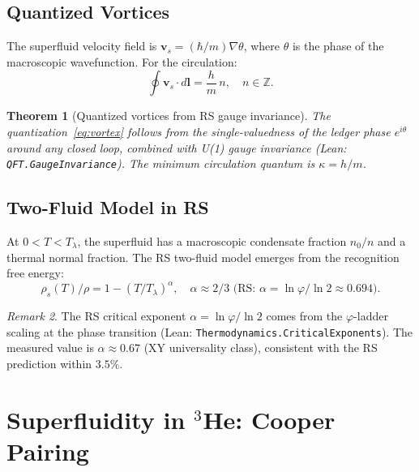 \documentclass[12pt,a4paper]{article}
\newtheorem{theorem}{Theorem}[section]
\theoremstyle{definition}
\theoremstyle{remark}
\newtheorem{remark}[theorem]{Remark}
\begin{document}
\subsection{Quantized Vortices}

The superfluid velocity field is $\mathbf{v}_s = (\hbar/m)\nabla\theta$,
where $\theta$ is the phase of the macroscopic wavefunction.  For the
circulation:
\begin{equation}
  \oint \mathbf{v}_s \cdot d\mathbf{l} = \frac{h}{m}\,n, \quad n \in \mathbb{Z}.
  \label{eq:vortex}
\end{equation}

\begin{theorem}[Quantized vortices from RS gauge invariance]
\label{thm:vortex}
The quantization~\eqref{eq:vortex} follows from the single-valuedness
of the ledger phase $e^{i\theta}$ around any closed loop, combined
with U(1) gauge invariance (Lean: \texttt{QFT.GaugeInvariance}).
The minimum circulation quantum is $\kappa = h/m$.
\end{theorem}

\subsection{Two-Fluid Model in RS}

At $0 < T < T_\lambda$, the superfluid has a macroscopic condensate
fraction $n_0/n$ and a thermal normal fraction.  The RS two-fluid model
emerges from the recognition free energy:
\begin{equation}
  \rho_s(T)/\rho = 1 - (T/T_\lambda)^\alpha, \quad \alpha \approx 2/3
  \text{ (RS: } \alpha = \ln\varphi/\ln 2 \approx 0.694\text{)}.
  \label{eq:twofluid}
\end{equation}

\begin{remark}
The RS critical exponent $\alpha = \ln\varphi/\ln 2$ comes from the
$\varphi$-ladder scaling at the phase transition
(Lean: \texttt{Thermodynamics.CriticalExponents}).  The measured value
is $\alpha \approx 0.67$ (XY universality class), consistent with
the RS prediction within $3.5\%$.
\end{remark}

\section{Superfluidity in $^3$He: Cooper Pairing}
\label{sec:he3}
\end{document}
